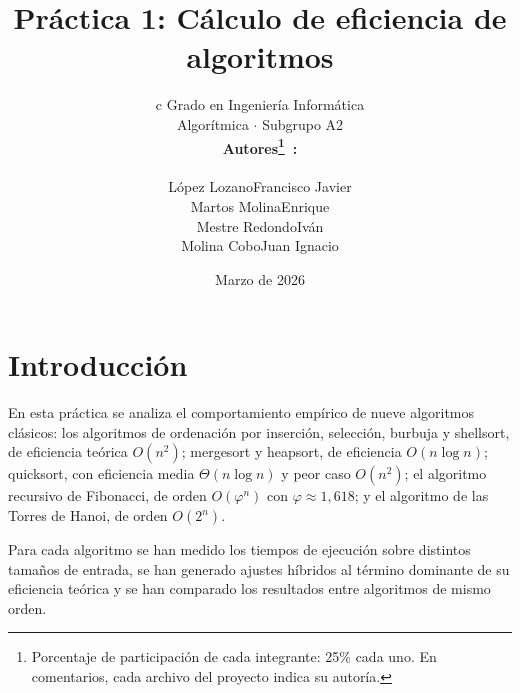 \documentclass[12pt]{article}
\begin{document}
 






\title{Práctica 1: Cálculo de eficiencia de algoritmos}
\author{%
    \begin{tabular}[t]{c}
        {\large Grado en Ingeniería Informática} \\[0.2em]
        {\normalsize Algorítmica $\cdot$ Subgrupo A2} \\[1em]
        \textbf{Autores\footnote{Porcentaje de participación de cada integrante: 
        25\% cada uno. En comentarios, cada archivo del proyecto indica su autoría.}\ :} \\[0.3em]
        \begin{tabular}[t]{r @{, } l}
            López Lozano   & Francisco Javier \\[0.5em]
            Martos Molina  & Enrique          \\[0.5em]
            Mestre Redondo & Iván             \\[0.5em]
            Molina Cobo    & Juan Ignacio
        \end{tabular}
    \end{tabular}%
}
\date{Marzo de 2026}

\maketitle

\section{Introducción}

En esta práctica se analiza el comportamiento empírico de nueve algoritmos clásicos:
los algoritmos de ordenación por inserción, selección, burbuja y shellsort, de eficiencia
teórica $O(n^2)$; mergesort y heapsort, de eficiencia $O(n\log{n})$;
quicksort, con eficiencia media $\Theta(n\log{n})$ y peor caso $O(n^2)$;
el algoritmo recursivo de Fibonacci, de orden $O(\varphi^n)$ con $\varphi\approx1,618$; y
el algoritmo de las Torres de Hanoi, de orden $O(2^n)$.

Para cada algoritmo se han medido los tiempos de ejecución sobre distintos tamaños
de entrada, se han generado ajustes híbridos al término dominante de su eficiencia
teórica y se han comparado los resultados entre algoritmos de mismo orden.
\end{document}
